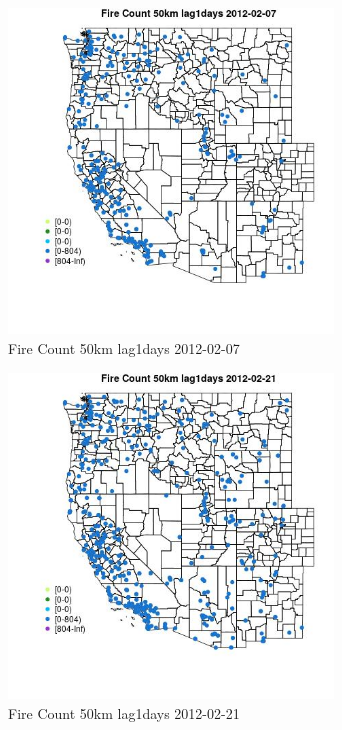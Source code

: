 \begin{figure} 
\centering  
\includegraphics[width=0.77\textwidth]{Code_Outputs/Report_ML_input_PM25_Step4_part_f_de_duplicated_aves_prioritize_24hr_obswNAs_MapObsFire_Count_50km_lag1days2012-02-07.jpg} 
\caption{\label{fig:Report_ML_input_PM25_Step4_part_f_de_duplicated_aves_prioritize_24hr_obswNAsMapObsFire_Count_50km_lag1days2012-02-07}Fire Count 50km lag1days 2012-02-07} 
\end{figure} 
 

\begin{figure} 
\centering  
\includegraphics[width=0.77\textwidth]{Code_Outputs/Report_ML_input_PM25_Step4_part_f_de_duplicated_aves_prioritize_24hr_obswNAs_MapObsFire_Count_50km_lag1days2012-02-21.jpg} 
\caption{\label{fig:Report_ML_input_PM25_Step4_part_f_de_duplicated_aves_prioritize_24hr_obswNAsMapObsFire_Count_50km_lag1days2012-02-21}Fire Count 50km lag1days 2012-02-21} 
\end{figure} 
 

